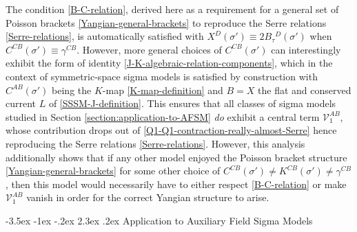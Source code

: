 \documentclass[12pt]{article}
\makeatletter
\renewcommand\section{\@startsection {section}{1}{\z@}%
                                   {-3.5ex \@plus -1ex \@minus -.2ex}%
                                   {2.3ex \@plus.2ex}%
                                   {\normalfont\large\bfseries}}
\numberwithin{equation}{section}
\makeatother
\begin{document}
The condition \eqref{B-C-relation}, derived here as a requirement for a general set of Poisson brackets \eqref{Yangian-general-brackets} to reproduce the Serre relations \eqref{Serre-relations}, is automatically satisfied with $X^{D}(\sigma')\equiv 2 B_{\tau}{}^{D}(\sigma')$ when $C^{CB}(\sigma')\equiv \gamma^{CB}$. However, more general choices of $C^{CB}(\sigma')$ can interestingly exhibit the form of identity \eqref{J-K-algebraic-relation-components}, which in the context of symmetric-space sigma models is satisfied by construction with $C^{AB}(\sigma')$ being the $K$-map \eqref{K-map-definition} and $B=X$ the flat and conserved current $L$ of \eqref{SSSM-J-definition}. This ensures that all classes of sigma models studied in Section \ref{section:application-to-AFSM} \emph{do} exhibit a central term $\mathcal{V}_{1}^{AB}$, whose contribution drops out of \eqref{Q1-Q1-contraction-really-almost-Serre} hence reproducing the Serre relations \eqref{Serre-relations}. However, this analysis additionally shows that if any other model enjoyed the Poisson bracket structure \eqref{Yangian-general-brackets} for some other choice of $C^{CB}(\sigma')\neq K^{CB}(\sigma')\neq\gamma^{CB}$, then this model would necessarily have to either respect \eqref{B-C-relation} or make $\mathcal{V}_{1}^{AB}$ vanish in order for the correct Yangian structure to arise.





\section{Application to Auxiliary Field Sigma Models}\label{section:application-to-AFSM}
\end{document}
